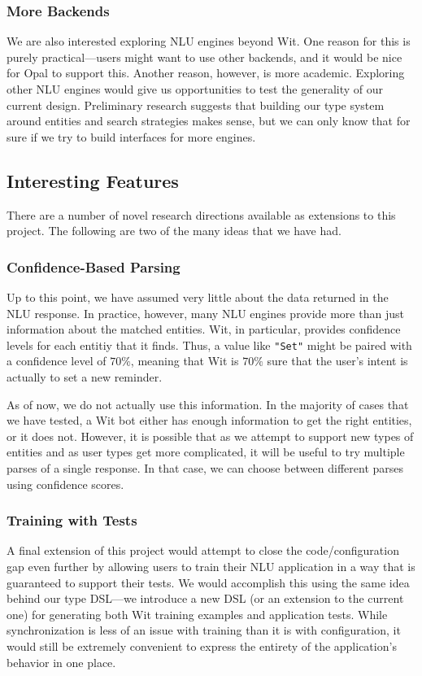 \documentclass[twocolumn]{article}
\newcommand{\ts}[1]{\texttt{#1}}
\begin{document}
\subsubsection{More Backends}
We are also interested exploring NLU engines beyond Wit. One reason for this is
purely practical---users might want to use other backends, and it would be nice
for Opal to support this. Another reason, however, is more academic. Exploring
other NLU engines would give us opportunities to test the generality of our
current design. Preliminary research suggests that building our type system
around entities and search strategies makes sense, but we can only know that for
sure if we try to build interfaces for more engines.

\subsection{Interesting Features}
There are a number of novel research directions available as extensions to this
project. The following are two of the many ideas that we have had.

\subsubsection{Confidence-Based Parsing}
Up to this point, we have assumed very little about the data returned in the NLU
response. In practice, however, many NLU engines provide more than just
information about the matched entities. Wit, in particular, provides confidence
levels for each entitiy that it finds. Thus, a value like \ts{"Set"} might be
paired with a confidence level of $70\%$, meaning that Wit is $70\%$ sure that
the user's intent is actually to set a new reminder.

As of now, we do not actually use this information. In the majority of cases
that we have tested, a Wit bot either has enough information to get the right
entities, or it does not. However, it is possible that as we attempt to support
new types of entities and as user types get more complicated, it will be useful
to try multiple parses of a single response. In that case, we can choose between
different parses using confidence scores.

\subsubsection{Training with Tests}
A final extension of this project would attempt to close the code/configuration
gap even further by allowing users to train their NLU application in a way that
is guaranteed to support their tests. We would accomplish this using the same
idea behind our type DSL---we introduce a new DSL (or an extension to the
current one) for generating both Wit training examples and application tests.
While synchronization is less of an issue with training than it is with
configuration, it would still be extremely convenient to express the entirety of
the application's behavior in one place.
\end{document}
